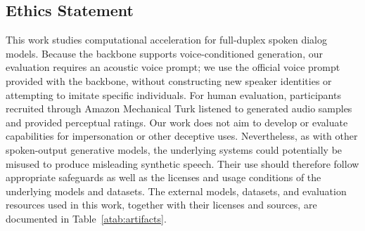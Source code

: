 \subsection*{Ethics Statement}

This work studies computational acceleration for full-duplex spoken dialog models.
Because the backbone supports voice-conditioned generation, our evaluation requires an acoustic voice prompt;
we use the official voice prompt provided with the backbone, without constructing new speaker
identities or attempting to imitate specific individuals.
For human evaluation, participants recruited through Amazon Mechanical Turk listened to generated audio samples and provided perceptual ratings.
Our work does not aim to develop or evaluate capabilities for impersonation or other deceptive uses.
Nevertheless, as with other spoken-output generative models, the underlying systems could potentially be misused to produce misleading synthetic speech.
Their use should therefore follow appropriate safeguards as well as the licenses and usage conditions of the underlying models and datasets.
The external models, datasets, and evaluation resources used in this work, together with their licenses and sources, are documented in Table~\ref{atab:artifacts}.